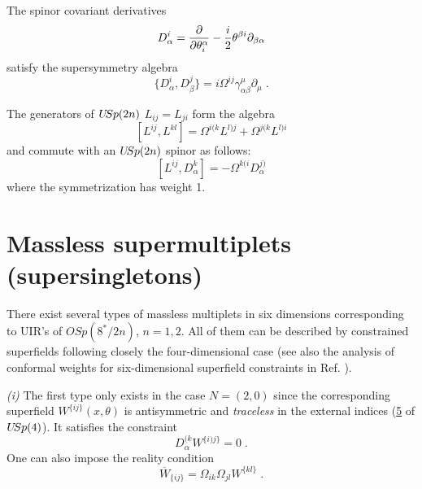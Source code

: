 \documentclass[a4paper,12pt]{article}
\begin{document}
The spinor covariant derivatives 
\begin{equation}\label{5}
  D^i_\alpha = {\partial\over \partial \theta^\alpha_i} -{i\over 
2}\theta^{\beta i} \partial_{\beta\alpha} 
\end{equation}
satisfy the supersymmetry algebra
\begin{equation}\label{6}
  \{ D^i_\alpha, D^j_\beta\} = 
i\Omega^{ij}\gamma^\mu_{\alpha\beta}\partial_\mu\;.
\end{equation}

 
The generators of $U\hskip-2pt Sp(2n)$ $L_{ij}=L_{ji}$ form the 
algebra 
\begin{equation}\label{7}
  [L^{ij},L^{kl}]= \Omega^{i(k}L^{l)j} + \Omega^{j(k}L^{l)i}
\end{equation}
and commute with an $U\hskip-2pt Sp(2n)$ spinor as follows:
\begin{equation}\label{7'}
  [L^{ij},D^k_\alpha]= -\Omega^{k(i}D^{j)}_\alpha
\end{equation}
where the symmetrization has weight 1. 


\section{Massless supermultiplets (supersingletons)}


There exist several types of massless multiplets in six dimensions 
corresponding to UIR's of $OSp(8^*/2n)$, $n=1,2$. All of them can 
be described by constrained superfields following closely the 
four-dimensional case \cite{SHST} (see also the analysis of conformal weights for
six-dimensional superfield constraints in Ref. \cite{Park}). 


{\sl (i)} The first type only exists in the case $N=(2,0)$ since 
the corresponding superfield $W^{\{ij\}}(x,\theta)$ is 
antisymmetric and {\sl traceless} in the external indices 
({\underline 5 } of $U\hskip-2pt Sp(4)$). It satisfies the 
constraint \cite{HSiT} 
\begin{equation}\label{8}
  D^{(k}_\alpha W^{\{i)j\}}=0\;.
\end{equation}
One can also impose the reality condition
\begin{equation}\label{8'}
  \overline W_{\{ij\}} = \Omega_{ik}\Omega_{jl} W^{\{kl\}}\;.
\end{equation}
\end{document}
